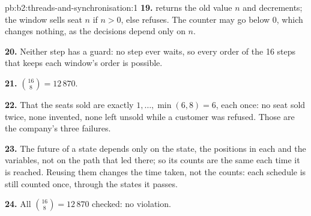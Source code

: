 \begin{solution}{pb:b2:threads-and-synchronisation:1}
\textbf{19.}  returns the old value $n$ and decrements; the window sells seat $n$ if
$n > 0$, else refuses. The counter may go below 0, which changes nothing, as the decisions depend only on $n$.

\textbf{20.} Neither step has a guard: no step ever waits, so every order of the 16 steps that keeps each window's
order is possible.

\textbf{21.} $\binom{16}{8} = 12\,870$.

\textbf{22.} That the seats sold are exactly $1, \dots, \min(6, 8) = 6$, each once: no seat sold twice, none invented,
none left unsold while a customer was refused. Those are the company's three failures.

\textbf{23.} The future of a state depends only on the state, the positions in each  and the variables, not on
the path that led there; so its counts are the same each time it is reached. Reusing them changes the time taken,
not the counts: each schedule is still counted once, through the states it passes.

\textbf{24.} All $\binom{16}{8} = 12\,870$  checked: no violation.
\end{solution}
